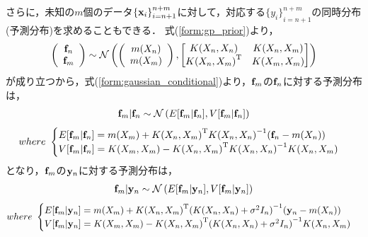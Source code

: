 \documentclass[11pt,a4j]{article}
\begin{document}
      さらに，未知の$m$個のデータ${\{ {\bf x}_i \} }_{i=n+1}^{n+m}$に対して，対応する${\{ y_i \} }_{i=n+1}^{n+m}$の同時分布(予測分布)を求めることもできる．
      式(\ref{form:gp_prior})より，
      \begin{align}
        \left(
          \begin{array}{c}
            {\bf f}_n \\ {\bf f}_m
          \end{array}
        \right)
        \sim
        \mathcal{N} 
        \left(
          \left(
            \begin{array}{c}
              m(X_n) \\ m(X_m)
            \end{array}
          \right)
          ,
          \begin{bmatrix}
            K(X_n,X_n) & K(X_n,X_m) \\
            {K(X_n,X_m)}^{\mathrm{T}} & K(X_m,X_m)
          \end{bmatrix}
        \right)
      \end{align}
      が成り立つから，式(\ref{form:gaussian_conditional})より，${\bf f}_m$の${\bf f}_n$に対する予測分布は，
      \begin{align}
        {\bf f}_m | {\bf f}_n \sim \mathcal{N}\left( E[{\bf f}_m | {\bf f}_n], V[{\bf f}_m | {\bf f}_n] \right) 
      \end{align}
      \begin{align}          
        where ~ 
        \begin{cases}
          E[{\bf f}_m | {\bf f}_n] = m(X_m) + {K(X_n,X_m)}^{\mathrm{T}} {K(X_n,X_n)}^{-1} ( {\bf f}_n - m(X_n) ) \\
          V[{\bf f}_m | {\bf f}_n] = K(X_m,X_m) - {K(X_n,X_m)}^{\mathrm{T}} {K(X_n,X_n)}^{-1} K(X_n,X_m)
        \end{cases} \nonumber
      \end{align}
      となり，${\bf f}_m$の${\bf y}_n$に対する予測分布は，
      \begin{align}
        {\bf f}_m | {\bf y}_n \sim \mathcal{N}\left( E[{\bf f}_m | {\bf y}_n], V[{\bf f}_m | {\bf y}_n] \right) 
      \end{align}
      \begin{align}          
        where ~ 
        \begin{cases}
          E[{\bf f}_m | {\bf y}_n] = m(X_m) + {K(X_n,X_m)}^{\mathrm{T}} {( K(X_n,X_n) + \sigma^2 I_n )} ^{-1} ( {\bf y}_n - m(X_n) ) \\
          V[{\bf f}_m | {\bf y}_n] = K(X_m,X_m) - {K(X_n,X_m)}^{\mathrm{T}} { ( K(X_n,X_n) + \sigma^2 I_n ) }^{-1} K(X_n,X_m)
        \end{cases} \nonumber
      \end{align}
\end{document}

